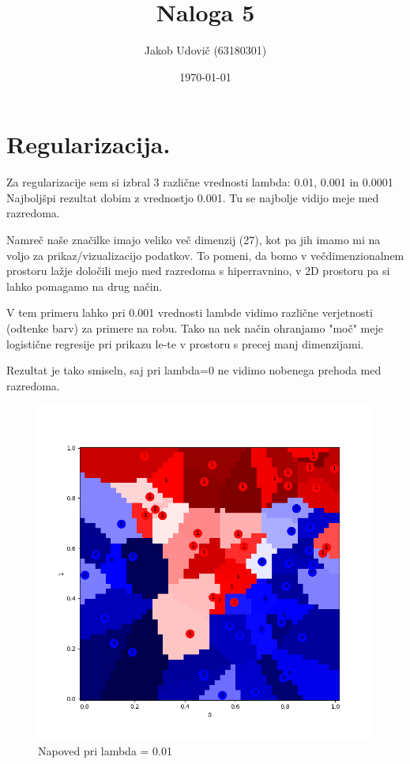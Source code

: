 \documentclass[a4paper,11pt]{article}
\title{Naloga 5}
\author{Jakob Udovič (63180301)}
\date{\today}
\begin{document}
\maketitle

\section{Regularizacija.}

Za regularizacije sem si izbral 3 različne vrednosti lambda: 0.01, 0.001 in 0.0001
Najboljšpi rezultat dobim z vrednostjo 0.001. Tu se najbolje vidijo meje med razredoma.


Namreč naše značilke imajo veliko več dimenzij (27), kot pa jih imamo mi na voljo za prikaz/vizualizacijo podatkov.
To pomeni, da bomo v večdimenzionalnem prostoru lažje določili mejo med razredoma s hiperravnino, v 2D prostoru pa si lahko pomagamo na drug način.

V tem primeru lahko pri 0.001 vrednosti lambde vidimo različne verjetnosti (odtenke barv) za primere na robu.
Tako na nek način ohranjamo "moč" meje logistične regresije pri prikazu le-te v prostoru s precej manj dimenzijami.

Rezultat je tako smiseln, saj pri lambda=0 ne vidimo nobenega prehoda med razredoma.

\begin{figure}[H]
\begin{center}
\includegraphics[scale=0.3]{01.png}
\caption{Napoved pri lambda = 0.01}
\label{slika1}
\end{center}
\end{figure}
\end{document}
